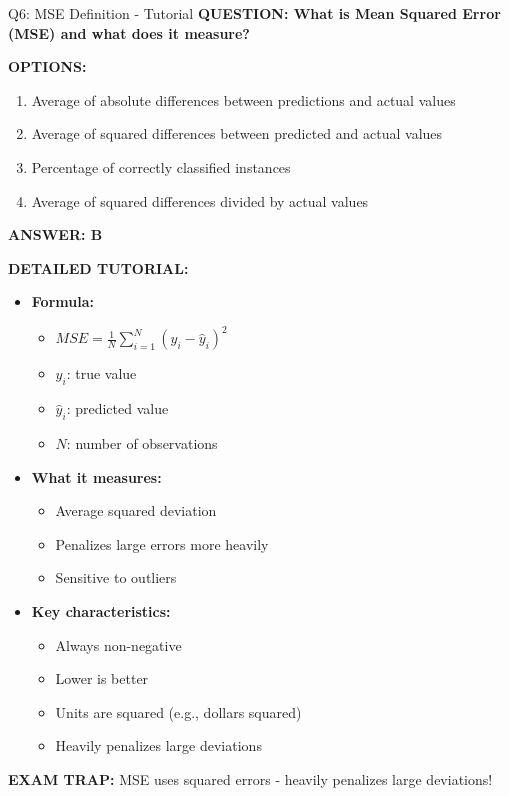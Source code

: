 \documentclass[8pt]{beamer}
\begin{document}
	\begin{frame}{Q6: MSE Definition - Tutorial}
		\fontsize{6.5}{7.5}\selectfont
		\textbf{QUESTION: What is Mean Squared Error (MSE) and what does it measure?}
		
		\vspace{0.1cm}
		\textbf{OPTIONS:}
		\begin{enumerate}
			\item Average of absolute differences between predictions and actual values
			\item Average of squared differences between predicted and actual values
			\item Percentage of correctly classified instances
			\item Average of squared differences divided by actual values
		\end{enumerate}
		
		\vspace{0.1cm}
		\textcolor{myblue}{\textbf{ANSWER: B}}
		
		\vspace{0.1cm}
		\textbf{DETAILED TUTORIAL:}
		\begin{itemize}
			\item \textbf{Formula:}
			\begin{itemize}
				\item $MSE = \frac{1}{N}\sum_{i=1}^N (y_i - \hat{y}_i)^2$
				\item $y_i$: true value
				\item $\hat{y}_i$: predicted value
				\item $N$: number of observations
			\end{itemize}
			\item \textbf{What it measures:}
			\begin{itemize}
				\item Average squared deviation
				\item Penalizes large errors more heavily
				\item Sensitive to outliers
			\end{itemize}
			\item \textbf{Key characteristics:}
			\begin{itemize}
				\item Always non-negative
				\item Lower is better
				\item Units are squared (e.g., dollars squared)
				\item Heavily penalizes large deviations
			\end{itemize}
		\end{itemize}
		
		\textcolor{myred}{\textbf{EXAM TRAP:}} MSE uses \textcolor{myblue}{squared errors} - heavily penalizes large deviations!
	\end{frame}
	
\end{document}
